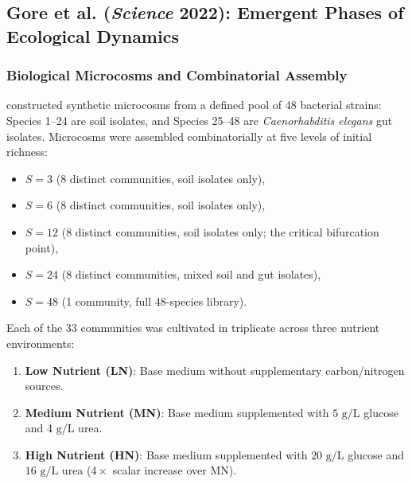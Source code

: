 \subsection{Gore et al. (\textit{Science} 2022): Emergent Phases of Ecological Dynamics}
\subsubsection{Biological Microcosms and Combinatorial Assembly}
\citet{hu2022emergent} constructed synthetic microcosms from a defined pool of 48 bacterial strains: Species 1--24 are soil isolates, and Species 25--48 are \textit{Caenorhabditis elegans} gut isolates. Microcosms were assembled combinatorially at five levels of initial richness:
\begin{itemize}
    \item $S = 3$ (8 distinct communities, soil isolates only),
    \item $S = 6$ (8 distinct communities, soil isolates only),
    \item $S = 12$ (8 distinct communities, soil isolates only; the critical bifurcation point),
    \item $S = 24$ (8 distinct communities, mixed soil and gut isolates),
    \item $S = 48$ (1 community, full 48-species library).
\end{itemize}
Each of the 33 communities was cultivated in triplicate across three nutrient environments:
\begin{enumerate}
    \item \textbf{Low Nutrient (LN)}: Base medium without supplementary carbon/nitrogen sources.
    \item \textbf{Medium Nutrient (MN)}: Base medium supplemented with $5\text{ g/L}$ glucose and $4\text{ g/L}$ urea.
    \item \textbf{High Nutrient (HN)}: Base medium supplemented with $20\text{ g/L}$ glucose and $16\text{ g/L}$ urea ($4\times$ scalar increase over MN).
\end{enumerate}

